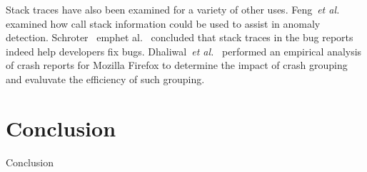 \documentclass{sig-alternate}
\begin{document}
Stack traces have also been examined for a variety of other uses. Feng~\emph{et al.}~\cite{1199328}  examined how call stack information could be used to assist in anomaly detection. Schroter ~emph{et al.}~\cite{5463280} concluded that stack traces in the bug reports indeed help developers fix bugs. Dhaliwal~\emph{et al.}~\cite{Dhaliwal:2011:CFC:2117694.2119726} performed an empirical analysis of crash reports for Mozilla Firefox to determine the impact of crash grouping and evaluvate the efficiency of such grouping.


\section{Conclusion}
\label{sec: conclusion}
Conclusion




 

\end{document}
